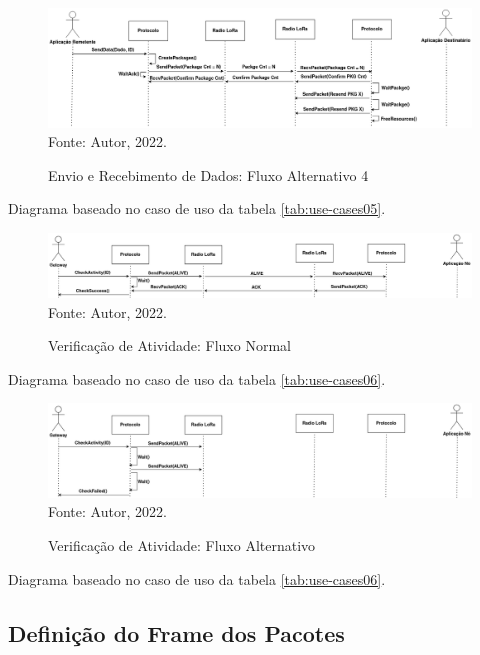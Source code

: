 \begin{figure}[htp]
    \centering
	\caption{Envio e Recebimento de Dados: Fluxo Alternativo 4}
    \includegraphics[width=\textwidth]{img/data-fa4.drawio.png}
    \label{fig:sq-data-fa4}
    Fonte: Autor, 2022.
\end{figure}

Diagrama baseado no caso de uso da tabela \ref{tab:use-cases05}.

\begin{figure}[htp]
    \centering
	\caption{Verificação de Atividade: Fluxo Normal}
    \includegraphics[width=\textwidth]{img/alive.drawio.png}
    \label{fig:sq-alive}
    Fonte: Autor, 2022.
\end{figure}

Diagrama baseado no caso de uso da tabela \ref{tab:use-cases06}.

\begin{figure}[htp]
    \centering
	\caption{Verificação de Atividade: Fluxo Alternativo}
    \includegraphics[width=\textwidth]{img/alive-fa.drawio.png}
    \label{fig:sq-alive-fa}
    Fonte: Autor, 2022.
\end{figure}

Diagrama baseado no caso de uso da tabela \ref{tab:use-cases06}.
\newpage

\subsection{Definição do Frame dos Pacotes}

